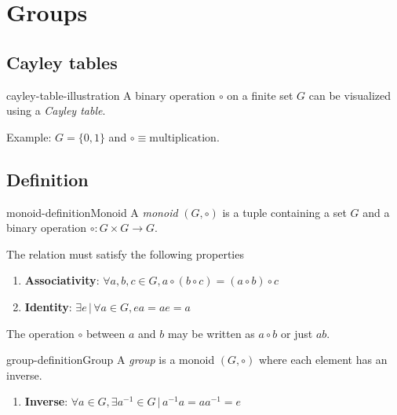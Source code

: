 \documentclass[preview]{standalone}
\begin{document}
\genpage

\section{Groups}

\subsection{Cayley tables}

\begin{snippet}{cayley-table-illustration}
A binary operation \(\circ\) on a finite set \(G\) can be
visualized using a \textit{Cayley table}.

Example: \(G=\{0,1\}\) and \(\circ \equiv \text{multiplication}\).
\\
\phantom{ }
\end{snippet}

\subsection{Definition}

\begin{snippetdefinition}{monoid-definition}{Monoid}
    A \textit{monoid} \((G,\circ)\) is a tuple containing a set \(G\) and
    a binary operation \(\circ \colon G \times G \to G\).
    
    The relation must satisfy the following properties
    
    \begin{enumerate}
        \item \textbf{Associativity}: \(\forall a,b,c\in G, a \circ (b \circ c) = (a \circ b) \circ c\)
        \item \textbf{Identity}: \(\exists e \,|\, \forall a \in G, ea=ae=a\) 
    \end{enumerate}
    
    The operation \(\circ\) between \(a\) and \(b\) may be written as
    \(a\circ b\) or just \(ab\).
\end{snippetdefinition}

\begin{snippetdefinition}{group-definition}{Group}
    A \textit{group} is a monoid \((G,\circ)\) where each element has an inverse.
    
    \begin{enumerate}
        \item \textbf{Inverse}: \(\forall a \in G, \exists a^{-1} \in G \,|\, a^{-1}a = aa^{-1} = e\)
    \end{enumerate}
\end{snippetdefinition}
\end{document}
